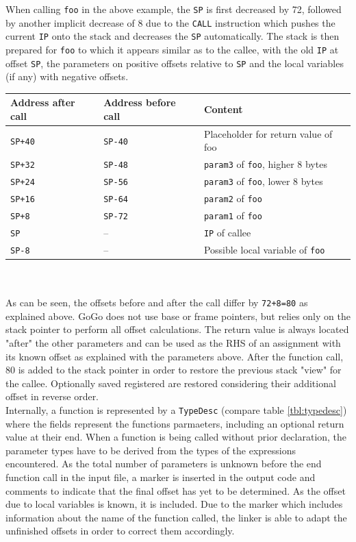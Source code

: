 \documentclass[a4paper]{scrartcl}
\begin{document}
      When calling \texttt{foo} in the above example, the \texttt{SP} is first decreased by 72, followed by another implicit decrease of 8 due to the \texttt{CALL} instruction which pushes the current \texttt{IP} onto the stack and decreases the \texttt{SP} automatically. The stack is then prepared for \texttt{foo} to which it appears similar as to the callee, with the old \texttt{IP} at offset \texttt{SP}, the parameters on positive offsets relative to \texttt{SP} and the local variables (if any) with negative offsets.
      \begin{table}[h!]
      \begin{tabular}{lll}
        \toprule
        \textbf{Address after call} & \textbf{Address before call} & \textbf{Content}\\
        \midrule
        \texttt{SP+40} & \texttt{SP-40} & Placeholder for return value of foo\\
        \texttt{SP+32} & \texttt{SP-48} & \texttt{param3} of \texttt {foo}, higher 8 bytes\\
        \texttt{SP+24} & \texttt{SP-56} & \texttt{param3} of \texttt {foo}, lower 8 bytes\\
        \texttt{SP+16} & \texttt{SP-64} & \texttt{param2} of \texttt {foo}\\
        \texttt{SP+8} & \texttt{SP-72} & \texttt{param1} of \texttt {foo}\\
        \texttt{SP} & -- & \texttt{IP} of callee\\
        \texttt{SP-8} & -- & Possible local variable of \texttt{foo}\\
        \bottomrule
      \end{tabular}
      \end{table}\\ \\
      As can be seen, the offsets before and after the call differ by \texttt{72+8=80} as explained above. GoGo does not use base or frame pointers, but relies only on the stack pointer to perform all offset calculations. The return value is always located "after" the other parameters and can be used as the RHS of an assignment with its known offset as explained with the parameters above. After the function call, 80 is added to the stack pointer in order to restore the previous stack "view" for the callee. Optionally saved registered are restored considering their additional offset in reverse order.\\
      Internally, a function is represented by a \texttt{TypeDesc} (compare table \ref{tbl:typedesc}) where the fields represent the functions parmaeters, including an optional return value at their end. When a function is being called without prior declaration, the parameter types have to be derived from the types of the expressions encountered. As the total number of parameters is unknown before the end function call in the input file, a marker is inserted in the output code and comments to indicate that the final offset has yet to be determined. As the offset due to local variables is known, it is included. Due to the marker which includes information about the name of the function called, the linker is able to adapt the unfinished offsets in order to correct them accordingly.\\
\end{document}

